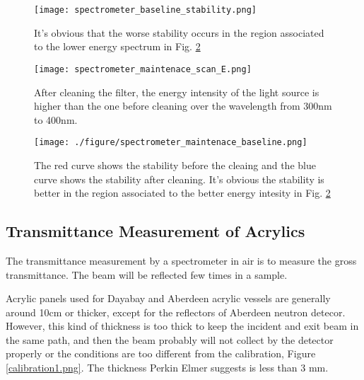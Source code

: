 \begin{figure}
    \centering
    \texttt{[image: spectrometer\_baseline\_stability.png]}
    \caption[The spectrometer baseline stability]
{It's obvious that the worse stability occurs in the region associated to the lower energy spectrum in Fig. \ref{fig:spectrometer_maintenace_scan_E.png}}
    \label{fig:spectrometer_baseline_stability.png}
    \end{figure}


\begin{figure}
    \centering
    \texttt{[image: spectrometer\_maintenace\_scan\_E.png]}
    \caption[The energy spectrum of the light source of Lambda 650]
{
After cleaning the filter, the energy intensity of the light source is higher than the one before cleaning over the wavelength from 300nm to 400nm.
}
    \label{fig:spectrometer_maintenace_scan_E.png}
    \end{figure}


\begin{figure}
    \centering
    \texttt{[image: ./figure/spectrometer\_maintenace\_baseline.png]}
    \caption[The spectrometer baseline stability before and after cleaing the filter]
{
The red curve shows the stability before the cleaing and the blue curve shows the stability after cleaning.
It's obvious the stability is better in the region associated to the better energy intesity in Fig. \ref{fig:spectrometer_maintenace_scan_E.png}
}
    \label{fig:spectrometer_maintenace_baseline.png}
    \end{figure}




\subsection{Transmittance Measurement of Acrylics}

The transmittance measurement by a spectrometer in air is to measure the gross transmittance.
The beam will be reflected few times in a sample.

Acrylic panels used for Dayabay and Aberdeen acrylic vessels
are generally around 10cm or thicker, except for the reflectors of Aberdeen
neutron detecor. However, this kind of thickness is too thick to
keep the incident and exit beam in the same path, and then
the beam probably will not collect by the detector properly or
the conditions are too different from the calibration, Figure \ref{calibration1.png}.
The thickness Perkin Elmer suggests is less than 3 mm.


